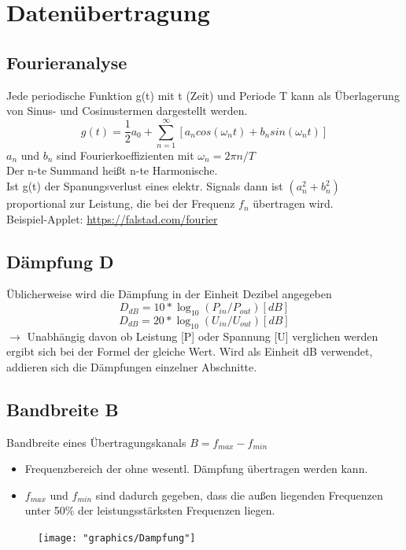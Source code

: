 \documentclass{scrreprt}
\begin{document}
\chapter{Datenübertragung}
\section{Fourieranalyse}
\label{sec:fourier}
Jede periodische Funktion g(t) mit t (Zeit) und Periode T kann als Überlagerung
von Sinus- und Cosinustermen dargestellt werden.
$$g(t)=\frac{1}{2}a_{0}+\sum_{n=1}^{\infty}{[a_{n}cos(\omega_{n}t)+b_{n}sin(\omega_{n}t)]}$$
$a_{n}$ und $b_{n}$ sind Fourierkoeffizienten mit $\omega_{n}=2\pi n/T $
\\
Der n-te Summand heißt n-te Harmonische.
\\
Ist g(t) der Spanungsverlust eines elektr. Signals dann ist $(a_{n}^{2}+b_{n}^{2})$ proportional
zur Leistung, die bei der Frequenz $f_{n}$ übertragen wird.
\\
Beispiel-Applet: \url{https://falstad.com/fourier}

\section{Dämpfung D}
\label{sec:dampf}
Üblicherweise wird die Dämpfung in der Einheit Dezibel angegeben
$$D_{dB}=10*\log_{10}(P_{in}/P_{out})  [dB]$$
$$D_{dB}=20*\log_{10}(U_{in}/U_{out})  [dB]$$
$\rightarrow$   Unabhängig davon ob Leistung [P] oder Spannung [U] verglichen werden
ergibt sich bei der Formel der gleiche Wert.
Wird als Einheit dB verwendet, addieren sich die Dämpfungen einzelner Abschnitte.

\section{Bandbreite B}
\label{sec:bandbreite}
Bandbreite eines Übertragungskanals $B = f_{max}-f_{min}$
\begin{itemize}
	\item Frequenzbereich der ohne wesentl. Dämpfung übertragen werden kann.
	\item $f_{max}$ und $f_{min}$ sind dadurch gegeben, dass die außen liegenden Frequenzen
	      unter 50\% der leistungsstärksten Frequenzen liegen.
\end{itemize}
\begin{figure}[h]
	\texttt{[image: "graphics/Dampfung"]}
	\centering
\end{figure}
\end{document}
